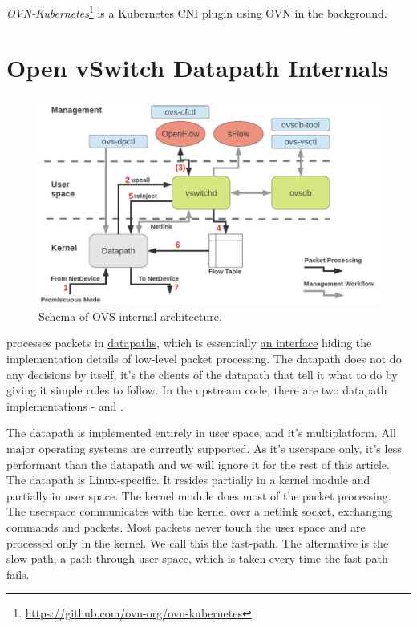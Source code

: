 \emph{OVN-Kubernetes}\footnote{\url{https://github.com/ovn-org/ovn-kubernetes}} is a Kubernetes CNI plugin using OVN in the background. 

\section{Open vSwitch Datapath Internals}
\label{sec:ovs-packet-processing}

\begin{figure}
    \centering
    \includegraphics[width=.9\linewidth]{img/ovs_architecture_01.png}
    \caption{Schema of OVS internal architecture.}
    \label{fig:ovs-arch-schema}
\end{figure}

 processes packets in \href{https://github.com/openvswitch/ovs/blob/e90a0727f17f6ad915a32735a8c0b282f2c8cd6f/lib/dpif.h}{datapaths}, which is essentially \href{https://github.com/openvswitch/ovs/blob/e90a0727f17f6ad915a32735a8c0b282f2c8cd6f/lib/dpif-provider.h\#L107-L117}{an interface} hiding the implementation details of low-level packet processing. The datapath does not do any decisions by itself, it's the clients of the datapath that tell it what to do by giving it simple rules to follow. In the upstream code, there are two datapath implementations - \href{https://github.com/openvswitch/ovs/blob/e90a0727f17f6ad915a32735a8c0b282f2c8cd6f/lib/dpif-netdev.c}{} and \href{https://github.com/openvswitch/ovs/blob/e90a0727f17f6ad915a32735a8c0b282f2c8cd6f/lib/dpif-netlink.c}{}.

The  datapath is implemented entirely in user space, and it's multiplatform. All major operating systems are currently supported. As it's userspace only, it's less performant than the  datapath and we will ignore it for the rest of this article. The  datapath is Linux-specific. It resides partially in a kernel module and partially in user space. The kernel module does most of the packet processing. The userspace communicates with the kernel over a netlink socket, exchanging commands and packets. Most packets never touch the user space and are processed only in the kernel. We call this the fast-path. The alternative is the slow-path, a path through user space, which is taken every time the fast-path fails.


